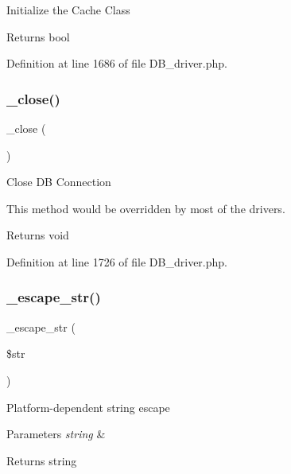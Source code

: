 Initialize the Cache Class

\begin{DoxyReturn}{Returns}
bool 
\end{DoxyReturn}


Definition at line 1686 of file D\+B\+\_\+driver.\+php.

\mbox{\label{class_c_i___d_b__driver_a4d9082658000e5ede8312067c6dda9db}} 
\subsubsection{\texorpdfstring{\_close()}{\_close()}}
{\footnotesize\ttfamily \+\_\+close (\begin{DoxyParamCaption}{ }\end{DoxyParamCaption})\hspace{0.3cm}{\ttfamily [protected]}}

Close DB Connection

This method would be overridden by most of the drivers.

\begin{DoxyReturn}{Returns}
void 
\end{DoxyReturn}


Definition at line 1726 of file D\+B\+\_\+driver.\+php.

\mbox{\label{class_c_i___d_b__driver_af8ef0237bfcdb19215b63fff769e7a55}} 
\subsubsection{\texorpdfstring{\_escape\_str()}{\_escape\_str()}}
{\footnotesize\ttfamily \+\_\+escape\+\_\+str (\begin{DoxyParamCaption}\item[{}]{\$str }\end{DoxyParamCaption})\hspace{0.3cm}{\ttfamily [protected]}}

Platform-\/dependent string escape


\begin{DoxyParams}{Parameters}
{\em string} & \\
\hline
\end{DoxyParams}
\begin{DoxyReturn}{Returns}
string 
\end{DoxyReturn}


